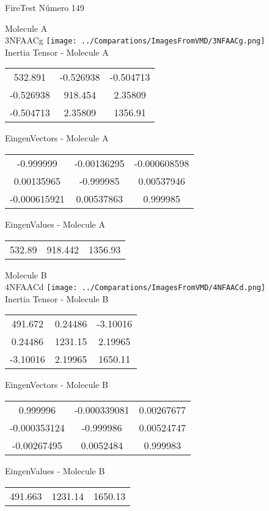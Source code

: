 \vtab[-2cm]
\begin{center}
{\large FireTest \tab Número 149}
\end{center}
\begin{multicols}{2}
\begin{center}

Molecule A \\ 
3NFAACg
\texttt{[image: ../Comparations/ImagesFromVMD/3NFAACg.png]}
\\
Inertia Tensor - Molecule A \\
\vtab

\begin{tabular}{|c c c|}
532.891	 & 	-0.526938	 & 	-0.504713	 \\
-0.526938	 & 	918.454	 & 	2.35809	 \\
-0.504713	 & 	2.35809	 & 	1356.91
\end{tabular}

\vtab
 EingenVectors - Molecule A     \\
\vtab
\begin{tabular}{|c c c|}
-0.999999	 & 	-0.00136295	 & 	-0.000608598	 \\
0.00135965	 & 	-0.999985	 & 	0.00537946	 \\
-0.000615921	 & 	0.00537863	 & 	0.999985
\end{tabular}

\vtab
 EingenValues - Molecule A     \\
\vtab
\begin{tabular}{|c c c|}
532.89	 & 	918.442	 & 	1356.93	 \\
\end{tabular}
\columnbreak

Molecule B \\ 
4NFAACd
\texttt{[image: ../Comparations/ImagesFromVMD/4NFAACd.png]}
\\
Inertia Tensor - Molecule B \\
\vtab

\begin{tabular}{|c c c|}
491.672	 & 	0.24486	 & 	-3.10016	 \\
0.24486	 & 	1231.15	 & 	2.19965	 \\
-3.10016	 & 	2.19965	 & 	1650.11
\end{tabular}

\vtab
 EingenVectors - Molecule B     \\
\vtab
\begin{tabular}{|c c c|}
0.999996	 & 	-0.000339081	 & 	0.00267677	 \\
-0.000353124	 & 	-0.999986	 & 	0.00524747	 \\
-0.00267495	 & 	0.0052484	 & 	0.999983
\end{tabular}

\vtab
 EingenValues - Molecule B     \\
\vtab
\begin{tabular}{|c c c|}
491.663	 & 	1231.14	 & 	1650.13	 \\
\end{tabular}

\end{center}
\end{multicols}

